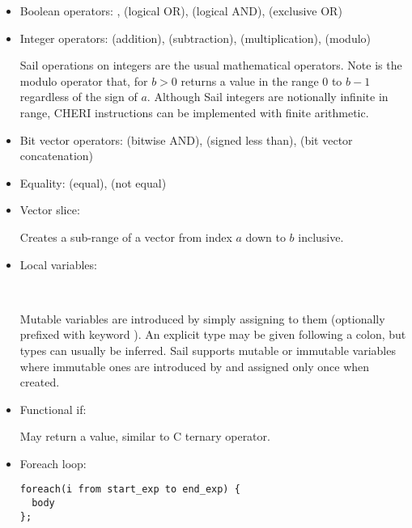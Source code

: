 \begin{itemize}
\item \label{sailRISCVznot}\label{sailMIPSznot}Boolean operators:
, \isail{|} (logical OR), \isail{&} (logical AND), \isail{^} (exclusive OR)

\item Integer operators:
\isail{+} (addition), \isail{-} (subtraction), \isail{*} (multiplication), \isail{\%} (modulo)

Sail operations on integers are the usual mathematical operators. Note  is the modulo operator that, for $b > 0$ returns a value in the range $0$ to $b-1$ regardless of the sign of $a$. Although Sail integers are notionally infinite in range, CHERI instructions can be implemented with finite arithmetic.

\item Bit vector operators:
\isail{&} (bitwise AND),  (signed less than),  (bit vector concatenation)

\item Equality:
\isail{==} (equal), \isail{!=} (not equal)

\item Vector slice:


Creates a sub-range of a vector from index $a$ down to $b$ inclusive.

\item Local variables:

   \\

Mutable variables are introduced by simply assigning to them (optionally prefixed with keyword ). An explicit type may be given following a colon, but types can usually be inferred. Sail supports mutable or immutable variables where immutable ones are introduced by  and assigned only once when created.

\item Functional if:


May return a value, similar to C ternary operator.


\item Foreach loop:

\begin{lstlisting}[language=sail,label=sailMIPSzto]
foreach(i from start_exp to end_exp) {
  body
};
\end{lstlisting}


\end{itemize}
